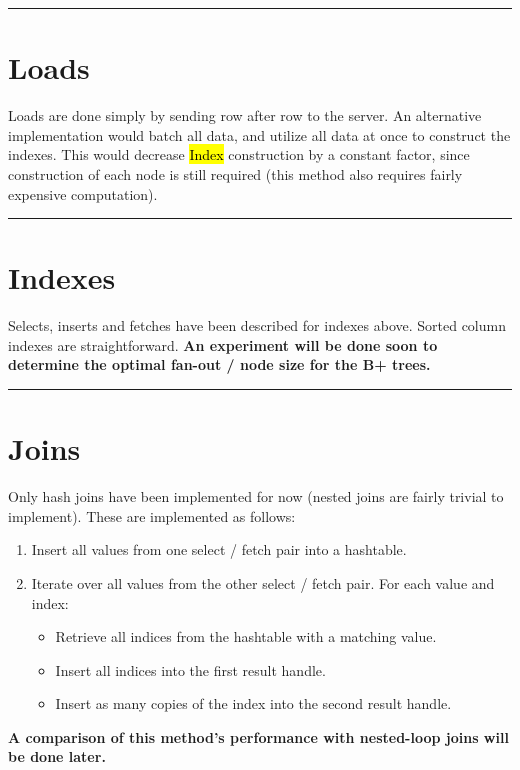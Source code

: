 \documentclass[paper=letter, fontsize=11pt]{scrartcl}
\numberwithin{equation}{section}
\numberwithin{figure}{section}
\numberwithin{table}{section}
\newcommand{\horrule}[1]{\rule{\linewidth}{#1}}
\newcommand{\ttt}[1]{\hl{\ttfamily #1}}
\begin{document}
\horrule{0.5pt}
\section{Loads}
Loads are done simply by sending row after row to the server.  An alternative implementation would batch all data, and utilize all data at once to construct the indexes.  This would decrease \ttt{Index} construction by a constant factor, since construction of each node is still required (this method also requires fairly expensive computation).

\horrule{0.5pt}
\section{Indexes}
Selects, inserts and fetches have been described for indexes above.  Sorted column indexes are straightforward.  \textbf{An experiment will be done soon to determine the optimal fan-out / node size for the B+ trees.}

\horrule{0.5pt}
\section{Joins}
Only hash joins have been implemented for now (nested joins are fairly trivial to implement).  These are implemented as follows: 
\begin{enumerate}
\item Insert all values from one select / fetch pair into a hashtable.
\item Iterate over all values from the other select / fetch pair.  For each value and index:
	\begin{itemize}
	\item Retrieve all indices from the hashtable with a matching value.
	\item Insert all indices into the first result handle.
	\item Insert as many copies of the index into the second result handle.
	\end{itemize}
\end{enumerate}
\textbf{A comparison of this method's performance with nested-loop joins will be done later.}
\end{document}
